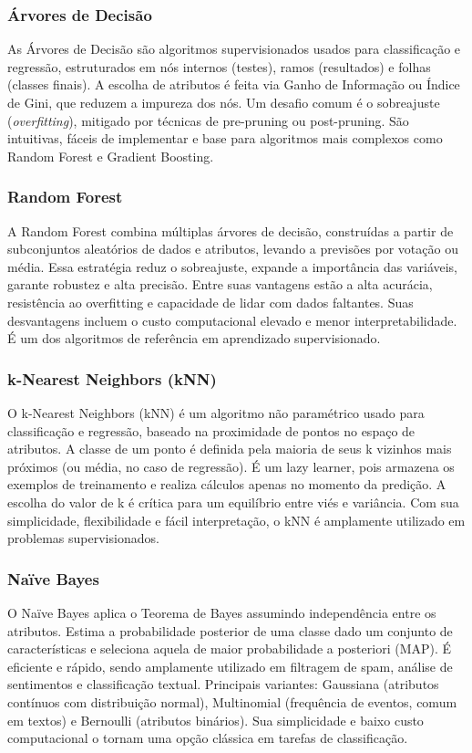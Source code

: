 \documentclass[english, spanish, brazilian]{RBIEarticle} %
\begin{document}
\subsubsection{Árvores de Decisão}
As Árvores de Decisão são algoritmos supervisionados usados para classificação e regressão, estruturados em nós internos (testes), ramos (resultados) e folhas (classes finais). A escolha de atributos é feita via Ganho de Informação ou Índice de Gini, que reduzem a impureza dos nós. Um desafio comum é o sobreajuste (\textit{overfitting}), mitigado por técnicas de pre-pruning ou post-pruning. São intuitivas, fáceis de implementar e base para algoritmos mais complexos como Random Forest e Gradient Boosting.

\subsubsection{Random Forest}
A Random Forest combina múltiplas árvores de decisão, construídas a partir de subconjuntos aleatórios de dados e atributos, levando a previsões por votação ou média. Essa estratégia reduz o sobreajuste, expande a importância das variáveis, garante robustez e alta precisão. Entre suas vantagens estão a alta acurácia, resistência ao overfitting e capacidade de lidar com dados faltantes. Suas desvantagens incluem o custo computacional elevado e menor interpretabilidade. É um dos algoritmos de referência em aprendizado supervisionado.

\subsubsection{k-Nearest Neighbors (kNN)}
O k-Nearest Neighbors (kNN) é um algoritmo não paramétrico usado para classificação e regressão, baseado na proximidade de pontos no espaço de atributos. A classe de um ponto é definida pela maioria de seus k vizinhos mais próximos (ou média, no caso de regressão). É um lazy learner, pois armazena os exemplos de treinamento e realiza cálculos apenas no momento da predição. A escolha do valor de k é crítica para um equilíbrio entre viés e variância. Com sua simplicidade, flexibilidade e fácil interpretação, o kNN é amplamente utilizado em problemas supervisionados.

\subsubsection{Naïve Bayes}
O Naïve Bayes aplica o Teorema de Bayes assumindo independência entre os atributos. Estima a probabilidade posterior de uma classe dado um conjunto de características e seleciona aquela de maior probabilidade a posteriori (MAP). É eficiente e rápido, sendo amplamente utilizado em filtragem de spam, análise de sentimentos e classificação textual. Principais variantes: Gaussiana (atributos contínuos com distribuição normal), Multinomial (frequência de eventos, comum em textos) e Bernoulli (atributos binários). Sua simplicidade e baixo custo computacional o tornam uma opção clássica em tarefas de classificação.
\end{document}
